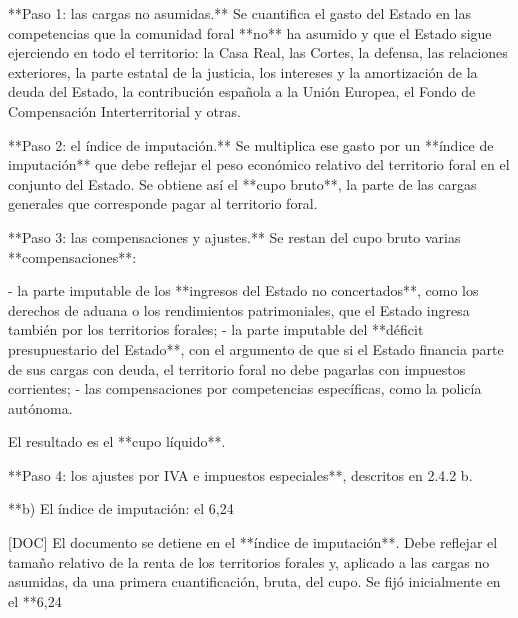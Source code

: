 \documentclass[10pt,a4paper]{article}
\begin{document}
**Paso 1: las cargas no asumidas.** Se cuantifica el gasto del Estado en las competencias que la comunidad foral **no** ha asumido y que el Estado sigue ejerciendo en todo el territorio: la Casa Real, las Cortes, la defensa, las relaciones exteriores, la parte estatal de la justicia, los intereses y la amortización de la deuda del Estado, la contribución española a la Unión Europea, el Fondo de Compensación Interterritorial y otras.

**Paso 2: el índice de imputación.** Se multiplica ese gasto por un **índice de imputación** que debe reflejar el peso económico relativo del territorio foral en el conjunto del Estado. Se obtiene así el **cupo bruto**, la parte de las cargas generales que corresponde pagar al territorio foral.

**Paso 3: las compensaciones y ajustes.** Se restan del cupo bruto varias **compensaciones**:

- la parte imputable de los **ingresos del Estado no concertados**, como los derechos de aduana o los rendimientos patrimoniales, que el Estado ingresa también por los territorios forales;
- la parte imputable del **déficit presupuestario del Estado**, con el argumento de que si el Estado financia parte de sus cargas con deuda, el territorio foral no debe pagarlas con impuestos corrientes;
- las compensaciones por competencias específicas, como la policía autónoma.

El resultado es el **cupo líquido**.

**Paso 4: los ajustes por IVA e impuestos especiales**, descritos en 2.4.2 b.

**b) El índice de imputación: el 6,24%

[DOC] El documento se detiene en el **índice de imputación**. Debe reflejar el tamaño relativo de la renta de los territorios forales y, aplicado a las cargas no asumidas, da una primera cuantificación, bruta, del cupo. Se fijó inicialmente en el **6,24%
\end{document}
